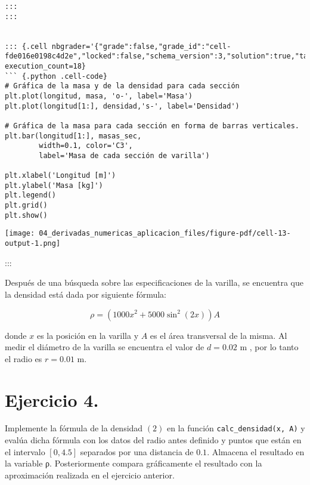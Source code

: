 \documentclass[
  letterpaper,
  DIV=11,
  numbers=noendperiod]{scrreprt}
\begin{document}
\begin{verbatim}
:::
:::


::: {.cell nbgrader='{"grade":false,"grade_id":"cell-fde016e0198c4d2e","locked":false,"schema_version":3,"solution":true,"task":false}' execution_count=18}
``` {.python .cell-code}
# Gráfica de la masa y de la densidad para cada sección
plt.plot(longitud, masa, 'o-', label='Masa')
plt.plot(longitud[1:], densidad,'s-', label='Densidad')

# Gráfica de la masa para cada sección en forma de barras verticales.
plt.bar(longitud[1:], masas_sec, 
        width=0.1, color='C3', 
        label='Masa de cada sección de varilla')

plt.xlabel('Longitud [m]')
plt.ylabel('Masa [kg]')
plt.legend()
plt.grid()
plt.show()
\end{verbatim}

\texttt{[image: 04\_derivadas\_numericas\_aplicacion\_files/figure-pdf/cell-13-output-1.png]}

:::

Después de una búsqueda sobre las especificaciones de la varilla, se
encuentra que la densidad está dada por siguiente fórmula:

\[
\rho = (1000 x^2 + 5000 \sin^2(2x)) A \tag{2}
\]

donde \(x\) es la posición en la varilla y \(A\) es el área transversal
de la misma. Al medir el diámetro de la varilla se encuentra el valor de
\(d = 0.02\) m , por lo tanto el radio es \(r = 0.01\) m.

\section{Ejercicio 4.}\label{ejercicio-4.}

Implemente la fórmula de la densidad \((2)\) en la función
\texttt{calc\_densidad(x,\ A)} y evalúa dicha fórmula con los datos del
radio antes definido y puntos que están en el intervalo \([0, 4.5]\)
separados por una distancia de \(0.1\). Almacena el resultado en la
variable ρ. Posteriormente compara gráficamente el resultado con la
aproximación realizada en el ejercicio anterior.
\end{document}
